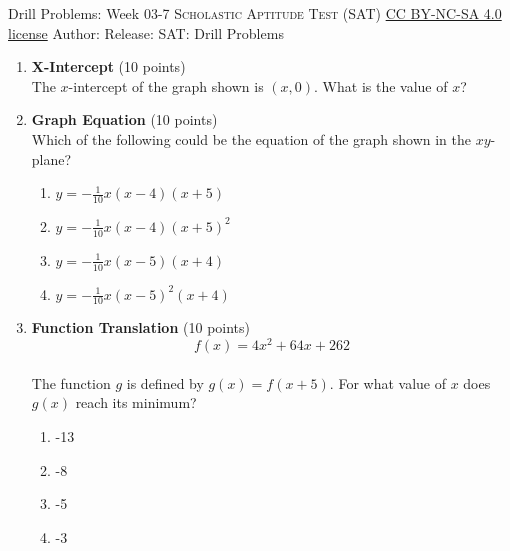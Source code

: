 \newpage\handout
{Drill Problems: Week 03-7}
{\textsc{Scholastic Aptitude Test (SAT)}}
{\href{https://creativecommons.org/licenses/by-nc-sa/4.0/}{CC BY-NC-SA 4.0 license}}
{Author: \BookAuthor}{Release: \generatedOn}
{SAT: Drill Problems}


\begin{enumerate}
  \item \textbf{X-Intercept} (10 points)\\
  The $x$-intercept of the graph shown is $(x, 0)$. What is the value of $x$?
  \begin{subanswer}
  \end{subanswer}
  

  \newpage


  \item \textbf{Graph Equation} (10 points)\\
  Which of the following could be the equation of the graph shown in the $xy$-plane?
  \begin{enumerate}[label=(\Alph*)]
    \item $y=-\frac{1}{10} x(x-4)(x+5)$
    \item $y=-\frac{1}{10} x(x-4)(x+5)^{2}$
    \item $y=-\frac{1}{10} x(x-5)(x+4)$
    \item $y=-\frac{1}{10} x (x-5)^{2}(x+4)$
  \end{enumerate}
  \begin{subanswer}
  \end{subanswer}


  \item \textbf{Function Translation} (10 points)\\
  $$f(x)=4 x^{2}+64 x+262$$\\
  The function $g$ is defined by $g(x)=f(x+5)$. For what value of $x$ does $g(x)$ reach its minimum?
  \begin{enumerate}[label=(\Alph*)]
    \item -13
    \item -8
    \item -5
    \item -3
  \end{enumerate}
  \begin{subanswer}
  \end{subanswer}



\end{enumerate}
